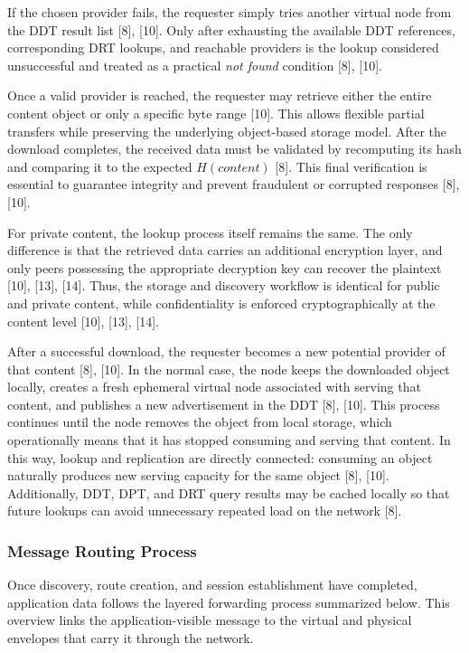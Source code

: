 \documentclass[12pt,a4paper]{article}
\begin{document}
If the chosen provider fails, the requester simply tries another virtual node from the DDT result list [8], [10]. Only after exhausting the available DDT references, corresponding DRT lookups, and reachable providers is the lookup considered unsuccessful and treated as a practical \textit{not found} condition [8], [10].

Once a valid provider is reached, the requester may retrieve either the entire content object or only a specific byte range [10]. This allows flexible partial transfers while preserving the underlying object-based storage model. After the download completes, the received data must be validated by recomputing its hash and comparing it to the expected \(H(content)\) [8]. This final verification is essential to guarantee integrity and prevent fraudulent or corrupted responses [8], [10].

For private content, the lookup process itself remains the same. The only difference is that the retrieved data carries an additional encryption layer, and only peers possessing the appropriate decryption key can recover the plaintext [10], [13], [14]. Thus, the storage and discovery workflow is identical for public and private content, while confidentiality is enforced cryptographically at the content level [10], [13], [14].

After a successful download, the requester becomes a new potential provider of that content [8], [10]. In the normal case, the node keeps the downloaded object locally, creates a fresh ephemeral virtual node associated with serving that content, and publishes a new advertisement in the DDT [8], [10]. This process continues until the node removes the object from local storage, which operationally means that it has stopped consuming and serving that content. In this way, lookup and replication are directly connected: consuming an object naturally produces new serving capacity for the same object [8], [10]. Additionally, DDT, DPT, and DRT query results may be cached locally so that future lookups can avoid unnecessary repeated load on the network [8].

\subsubsection{Message Routing Process}

Once discovery, route creation, and session establishment have completed, application data follows the layered forwarding process summarized below. This overview links the application-visible message to the virtual and physical envelopes that carry it through the network.
\end{document}
